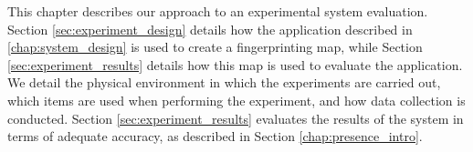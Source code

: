 This chapter describes our approach to an experimental system evaluation.
Section \ref{sec:experiment_design} details how the application described in \ref{chap:system_design} is used to create a fingerprinting map, while Section \ref{sec:experiment_results} details how this map is used to evaluate the application.
We detail the physical environment in which the experiments are carried out, which items are used when performing the experiment, and how data collection is conducted.
Section \ref{sec:experiment_results} evaluates the results of the system in terms of adequate accuracy, as described in Section \ref{chap:presence_intro}. 